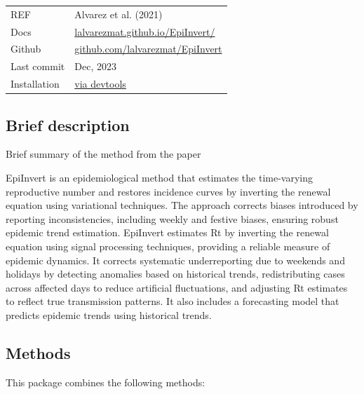 \documentclass[
  letterpaper,
  DIV=11,
  numbers=noendperiod]{scrreprt}
\begin{document}

\begin{longtable}[]{@{}
  >{\raggedright\arraybackslash}p{}
  >{\raggedright\arraybackslash}p{}@{}}
\toprule\noalign{}
\endhead
\bottomrule\noalign{}
\endlastfoot
REF & Alvarez et al. (2021) \\
Docs &
\href{https://lalvarezmat.github.io/EpiInvert/}{lalvarezmat.github.io/EpiInvert/} \\
Github &
\href{https://github.com/lalvarezmat/EpiInvert}{github.com/lalvarezmat/EpiInvert} \\
Last commit & Dec, 2023 \\
Installation & \href{https://lalvarezmat.github.io/EpiInvert/}{via
devtools} \\
\end{longtable}

\subsection*{Brief description}\label{brief-description-7}

Brief summary of the method from the paper

EpiInvert is an epidemiological method that estimates the time-varying
reproductive number and restores incidence curves by inverting the
renewal equation using variational techniques. The approach corrects
biases introduced by reporting inconsistencies, including weekly and
festive biases, ensuring robust epidemic trend estimation. EpiInvert
estimates Rt by inverting the renewal equation using signal processing
techniques, providing a reliable measure of epidemic dynamics. It
corrects systematic underreporting due to weekends and holidays by
detecting anomalies based on historical trends, redistributing cases
across affected days to reduce artificial fluctuations, and adjusting Rt
estimates to reflect true transmission patterns. It also includes a
forecasting model that predicts epidemic trends using historical trends.

\subsection*{Methods}\label{methods-6}

This package combines the following methods:
\end{document}
